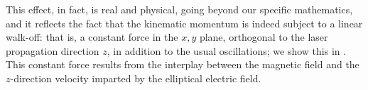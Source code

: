 This effect, in fact, is real and physical, going beyond our specific mathematics, and it reflects the fact that the kinematic momentum is indeed subject to a linear walk-off: that is, a constant force in the $x,y$ plane, orthogonal to the laser propagation direction $z$, in addition to the usual oscillations; we show this in . This constant force results from the interplay between the magnetic field and the $z$-direction velocity imparted by the elliptical electric field.



\begin{figure}[htb]
  \centering
  
  \hspace{9mm}$\,$
  
  \vspace{5mm}
  

\end{figure}
